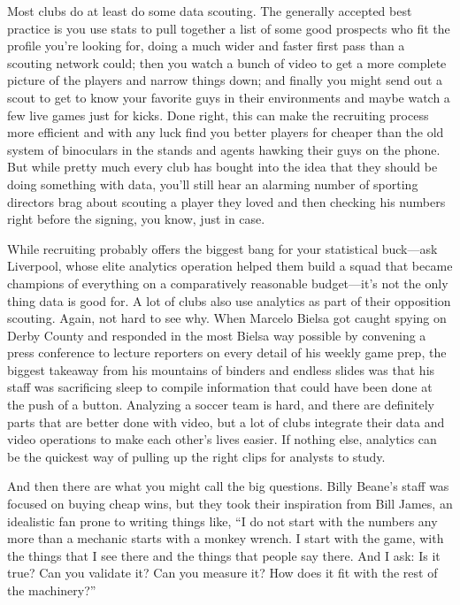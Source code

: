 Most clubs do at least do some data scouting. The generally accepted best practice is you use stats to pull together a list of some good prospects who fit the profile you’re looking for, doing a much wider and faster first pass than a scouting network could; then you watch a bunch of video to get a more complete picture of the players and narrow things down; and finally you might send out a scout to get to know your favorite guys in their environments and maybe watch a few live games just for kicks. Done right, this can make the recruiting process more efficient and with any luck find you better players for cheaper than the old system of binoculars in the stands and agents hawking their guys on the phone. But while pretty much every club has bought into the idea that they should be doing something with data, you’ll still hear an alarming number of sporting directors brag about scouting a player they loved and then checking his numbers right before the signing, you know, just in case.

While recruiting probably offers the biggest bang for your statistical buck—ask Liverpool, whose elite analytics operation helped them build a squad that became champions of everything on a comparatively reasonable budget—it’s not the only thing data is good for. A lot of clubs also use analytics as part of their opposition scouting. Again, not hard to see why. When Marcelo Bielsa got caught spying on Derby County and responded in the most Bielsa way possible by convening a press conference to lecture reporters on every detail of his weekly game prep, the biggest takeaway from his mountains of binders and endless slides was that his staff was sacrificing sleep to compile information that could have been done at the push of a button. Analyzing a soccer team is hard, and there are definitely parts that are better done with video, but a lot of clubs integrate their data and video operations to make each other’s lives easier. If nothing else, analytics can be the quickest way of pulling up the right clips for analysts to study.

And then there are what you might call the big questions. Billy Beane’s staff was focused on buying cheap wins, but they took their inspiration from Bill James, an idealistic fan prone to writing things like, “I do not start with the numbers any more than a mechanic starts with a monkey wrench. I start with the game, with the things that I see there and the things that people say there. And I ask: Is it true? Can you validate it? Can you measure it? How does it fit with the rest of the machinery?”

